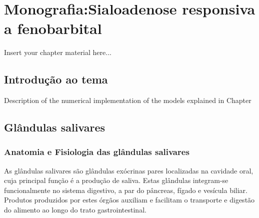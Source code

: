
\chapter{Monografia:Sialoadenose responsiva a fenobarbital}
\label{chapter:Monografia:Sialoadenose responsiva a fenobarbital}

Insert your chapter material here...

\section{Introdução ao tema}
\label{section:Introdução ao tema}

Description of the numerical implementation of the models explained in Chapter

\section{Glândulas salivares}
\label{section:Glândulas salivares}

\subsection{Anatomia e Fisiologia das glândulas salivares}

As glândulas salivares são glândulas exócrinas pares localizadas na cavidade oral, cuja principal função é a produção de saliva. \cite{Junqueira}Estas glândulas integram-se funcionalmente no sistema digestivo, a par do pâncreas, fígado e vesícula biliar. \cite{Junqueira} Produtos produzidos por estes órgãos auxiliam e facilitam o transporte e digestão do alimento ao longo do trato gastrointestinal. \cite{Junqueira}

